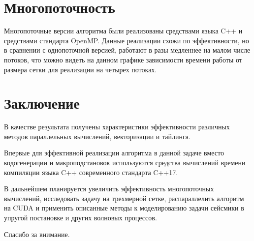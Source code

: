 \documentclass[18pt]{article}
\begin{document}
\section{Многопоточность}
\par
Многопоточные версии алгоритма были реализованы средствами языка C++ и 
средствами стандарта OpenMP. Данные реализации схожи по эффективности, но в 
сравнении с однопоточной версией, работают в разы медленнее на малом числе 
потоков, что можно видеть на данном графике зависимости времени работы от 
размера сетки для реализации на четырех потоках.

\section{Заключение}
\par
В качестве результата получены характеристики эффективности различных 
методов параллельных вычислений, векторизации и тайлинга.

Впервые для эффективной реализации алгоритма в данной задаче
вместо кодогенерации и макроподстановок используются средства вычислений
времени компиляции языка C++ современного стандарта C++17.

В дальнейшем планируется увеличить эффективность многопоточных вычислений, 
исследовать задачу на трехмерной сетке, распараллелить алгоритм на CUDA 
и применить описанные методы к моделированию задачи сейсмики 
в упругой постановке и других волновых процессов.

Спасибо за внимание.

\end{document}
